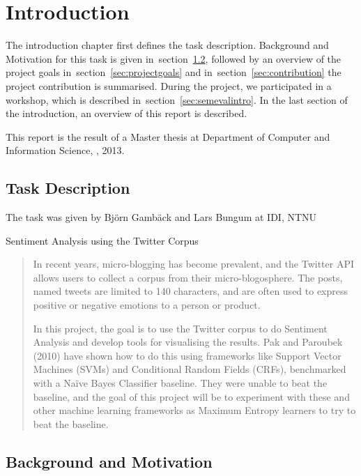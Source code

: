\chapter{Introduction}

The introduction chapter first defines the task description. Background and Motivation for this task is given in~section~\ref{sec:motivation}, followed by an overview of the project goals in~section~\ref{sec:projectgoals} and in~section~\ref{sec:contribution} the project contribution is summarised. During the project, we participated in a workshop, which is described in~section~\ref{sec:semevalintro}. In the last section of the introduction, an overview of this report is described. 

This report is the result of a Master thesis at Department of Computer and Information Science, , 2013. 

\section{Task Description}
\label{sec:task}

The task was given by Bj\"{o}rn Gamb\"{a}ck and Lars Bungum at IDI, NTNU

\begin{center} \Large Sentiment Analysis using the Twitter Corpus \end{center}
\begin{quotation}
In recent years, micro-blogging has become prevalent, and the Twitter API allows users to collect a corpus from their micro-blogosphere. The posts, named tweets are limited to 140 characters, and are often used to express positive or negative emotions to a person or product.

In this project, the goal is to use the Twitter corpus to do Sentiment Analysis and develop tools for visualising the results. Pak and Paroubek (2010) have shown how to do this using frameworks like Support Vector Machines (SVMs) and Conditional Random Fields (CRFs), benchmarked with a Na\"{i}ve Bayes Classifier baseline. They were unable to beat the baseline, and the goal of this project will be to experiment with these and other machine learning frameworks as Maximum Entropy learners to try to beat the baseline.
\end{quotation}


\section{Background and Motivation}
\label{sec:motivation}

